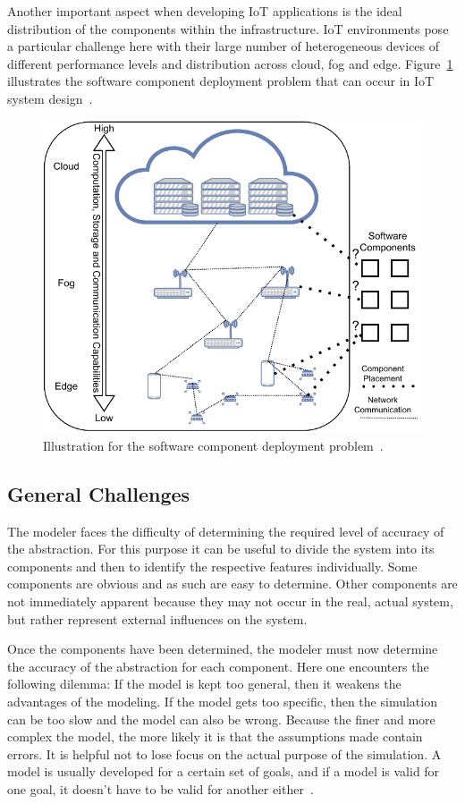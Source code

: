 \documentclass[english,version-2019-11]{uzl-thesis}
\begin{document}
Another important aspect when developing
IoT applications is the ideal distribution
of the components within the infrastructure.
IoT environments pose a particular challenge
here with their large number of heterogeneous
devices of different performance levels and
distribution across cloud, fog and edge.
Figure~\ref{figure_deployment} illustrates the software component deployment problem that can occur in IoT system design~\cite{AnalyzeQualities}.
\begin{figure}[htpb]
  \centering
  \includegraphics{figure_deployment.pdf}
  \caption{Illustration for the software component deployment problem~\cite{AnalyzeQualities}.}
  \label{figure_deployment}
\end{figure}

\subsection{General Challenges}
The modeler faces the difficulty of determining the required
level of accuracy of the abstraction.
For this purpose it can be useful to divide the system into its components and then to identify the respective features individually.
Some components are obvious and as such
are easy to determine. Other components
are not immediately apparent because
they may not occur in the real, actual system,
but rather represent external influences
on the system.~\cite{SimJavaTutorial}

Once the components have been determined, the modeler
must now determine the accuracy of the abstraction
for each component. Here one encounters
the following dilemma:
If the model is kept too general,
then it weakens the advantages of the modeling.
If the model gets too specific,
then the simulation can be too slow and
the model can also be wrong.
Because the finer and more complex the model, the more likely it is that the assumptions made contain errors.
It is helpful not to lose focus on the actual
purpose of the simulation.
A model is usually developed for a certain
set of goals, and if a model is valid for
one goal, it doesn't have to be
valid for another either~\cite{BuildValidModels}.
\end{document}
